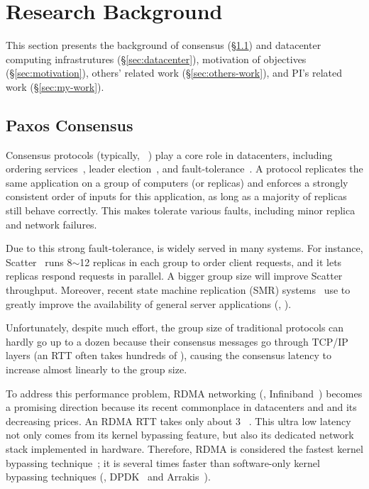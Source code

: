 \vspace{-.15in}\section{Research Background} 
\label{sec:background}\vspace{-.075in}

This section presents the background of consensus (\S\ref{sec:consensus}) and 
datacenter computing infrastrutures (\S\ref{sec:datacenter}), motivation of 
objectives (\S\ref{sec:motivation}), others' related work 
(\S\ref{sec:others-work}), and PI's related work (\S\ref{sec:my-work}).

\vspace{-.15in}\subsection{Paxos Consensus} 
\label{sec:consensus}\vspace{-.075in}

Consensus protocols (typically, 
\paxos~\cite{paxos:practical,paxos,paxos:simple,paxos:complex}) play a core
role in datacenters, including 
ordering services~\cite{ellis:thesis,manos:hotdep10,scatter:sosp11},
leader election~\cite{zookeeper, chubby:osdi}, and
fault-tolerance~\cite{eve:osdi12,rex:eurosys14,crane:sosp15}. A \paxos protocol
replicates the same application on a group of computers (or replicas) and 
enforces a strongly consistent order of inputs for this application, as long as 
a majority of replicas still behave correctly. This makes \paxos tolerate 
various faults, including minor replica and network failures.

Due to this strong fault-tolerance, \paxos is widely served in many systems.
For instance, Scatter~\cite{scatter:sosp11} runs 8$\sim$12 replicas in each
\paxos group to order client requests, and it lets replicas respond requests
in parallel. A bigger group size will improve Scatter throughput. 
Moreover, recent state machine replication (SMR) 
systems~\cite{eve:osdi12,rex:eurosys14,crane:sosp15} use \paxos to greatly 
improve the availability of general server applications (\eg, \mysql).

Unfortunately, despite much effort, the group size of traditional \paxos 
protocols can hardly go up to a dozen because their consensus messages 
go through TCP/IP layers (an RTT often takes hundreds of \us), causing the 
consensus latency to increase almost linearly to the group size.

To address this \paxos performance problem, RDMA networking (\eg, 
Infiniband~\cite{infiniband}) becomes a promising direction because its recent 
commonplace in datacenters and and its decreasing prices. An RDMA RTT takes 
only about 3 \us~\cite{pilaf:usenix14}. This ultra low latency not only comes 
from its kernel bypassing feature, but also its dedicated network stack 
implemented in hardware. Therefore, RDMA is considered the fastest kernel 
bypassing technique~\cite{herd:sigcomm14,pilaf:usenix14,dare:hpdc15}; it is 
several times faster than software-only kernel bypassing techniques (\eg, 
DPDK~\cite{dpdk} and Arrakis~\cite{arrakis:osdi14}).

